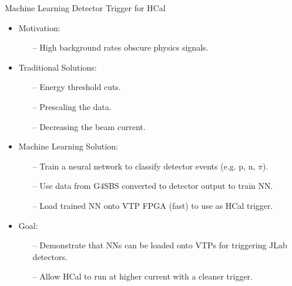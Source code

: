 \documentclass[10pt]{beamer}
\begin{document}
\begin{frame}{Machine Learning Detector Trigger for HCal}

	\begin{itemize}
		\item \alert{Motivation:}
			\begin{itemize}
				\item[--] High background rates obscure physics signals.
			\end{itemize}
		\item \alert{Traditional Solutions:}
			\begin{itemize}
				\item[--] Energy threshold cuts.
				\item[--] Prescaling the data.
				\item[--] Decreasing the beam current.
			\end{itemize}
		\item \alert{Machine Learning Solution:}
			\begin{itemize}
				\item[--] Train a neural network to classify detector events (e.g. p, n, $\pi$).
				\item[--] Use data from G4SBS converted to detector output to train NN.
				\item[--] Load trained NN onto VTP FPGA (fast) to use as HCal trigger.
			\end{itemize}
		\item \alert{Goal:}
			\begin{itemize}
				\item[--] Demonstrate that NNs can be loaded onto VTPs for triggering JLab detectors.
				\item[--] Allow HCal to run at higher current with a cleaner trigger.
			\end{itemize}
	\end{itemize}

\end{frame}
\end{document}
